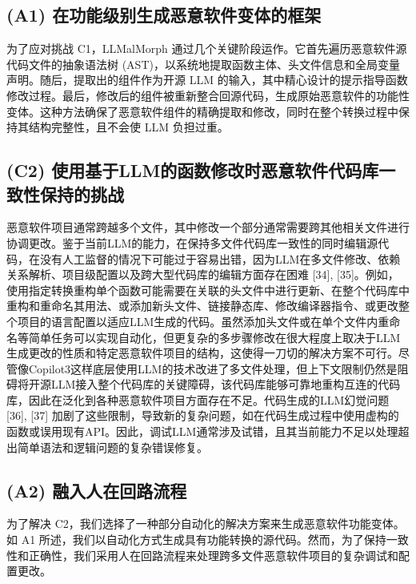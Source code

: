 \subsection{(A1) 在功能级别生成恶意软件变体的框架}
为了应对挑战 C1，LLMalMorph 通过几个关键阶段运作。它首先遍历恶意软件源代码文件的抽象语法树 (AST)，以系统地提取函数主体、头文件信息和全局变量声明。随后，提取出的组件作为开源 LLM 的输入，其中精心设计的提示指导函数修改过程。最后，修改后的组件被重新整合回源代码，生成原始恶意软件的功能性变体。这种方法确保了恶意软件组件的精确提取和修改，同时在整个转换过程中保持其结构完整性，且不会使 LLM 负担过重。

\subsection{(C2) 使用基于LLM的函数修改时恶意软件代码库一致性保持的挑战}
恶意软件项目通常跨越多个文件，其中修改一个部分通常需要跨其他相关文件进行协调更改。鉴于当前LLM的能力，在保持多文件代码库一致性的同时编辑源代码，在没有人工监督的情况下可能过于容易出错，因为LLM在多文件修改、依赖关系解析、项目级配置以及跨大型代码库的编辑方面存在困难 [34], [35]。例如，使用指定转换重构单个函数可能需要在关联的头文件中进行更新、在整个代码库中重构和重命名其用法、或添加新头文件、链接静态库、修改编译器指令、或更改整个项目的语言配置以适应LLM生成的代码。虽然添加头文件或在单个文件内重命名等简单任务可以实现自动化，但更复杂的多步骤修改在很大程度上取决于LLM生成更改的性质和特定恶意软件项目的结构，这使得一刀切的解决方案不可行。尽管像Copilot3这样底层使用LLM的技术改进了多文件处理，但上下文限制仍然是阻碍将开源LLM接入整个代码库的关键障碍，该代码库能够可靠地重构互连的代码库，因此在泛化到各种恶意软件项目方面存在不足。代码生成的LLM幻觉问题 [36], [37] 加剧了这些限制，导致新的复杂问题，如在代码生成过程中使用虚构的函数或误用现有API。因此，调试LLM通常涉及试错，且其当前能力不足以处理超出简单语法和逻辑问题的复杂错误修复。

\subsection{(A2) 融入人在回路流程}
为了解决 C2，我们选择了一种部分自动化的解决方案来生成恶意软件功能变体。如 A1 所述，我们以自动化方式生成具有功能转换的源代码。然而，为了保持一致性和正确性，我们采用人在回路流程来处理跨多文件恶意软件项目的复杂调试和配置更改。